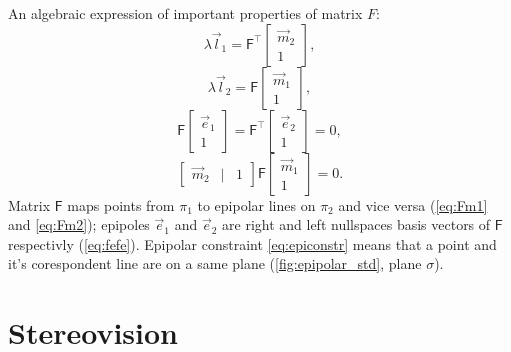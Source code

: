 An algebraic expression of important properties of matrix $F$:
\begin{equation}
    \label{eq:Fm2}
    \lambda \vec{l}_1 = \pmb{\mathsf{F}}^\top \begin{bmatrix} \vec{m}_2 \\ 1 \end{bmatrix},
\end{equation}
\begin{equation}
    \label{eq:Fm1}
    \lambda \vec{l}_2 = \pmb{\mathsf{F}} \begin{bmatrix} \vec{m}_1 \\ 1 \end{bmatrix},
\end{equation}
\begin{equation}
    \label{eq:fefe}
    \pmb{\mathsf{F}} \begin{bmatrix} \vec{e}_1 \\ 1 \end{bmatrix} = \pmb{\mathsf{F}}^\top \begin{bmatrix} \vec{e}_2 \\ 1 \end{bmatrix} = 0,
\end{equation}
\begin{equation}
    \label{eq:epiconstr}
    \begin{bmatrix} \vec{m}_2 & | & 1 \end{bmatrix} \pmb{\mathsf{F}} \begin{bmatrix} \vec{m}_1 \\ 1 \end{bmatrix} = 0.
\end{equation}
Matrix $\pmb{\mathsf{F}}$ maps points from $\pi_1$ to epipolar lines on $\pi_2$ and vice versa (\autoref{eq:Fm1} and \autoref{eq:Fm2}); epipoles $\vec{e}_1$ and $\vec{e}_2$ are right and left nullspaces basis vectors of $\pmb{\mathsf{F}}$ respectivly (\autoref{eq:fefe}).
Epipolar constraint \autoref{eq:epiconstr} means that a point and it's corespondent line are on a same plane (\autoref{fig:epipolar_std}, plane $\sigma$).

\section{Stereovision}

